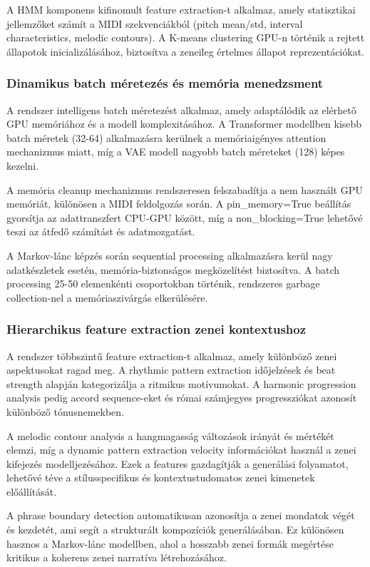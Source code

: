 A HMM komponens kifinomult feature extraction-t alkalmaz, amely statisztikai jellemzőket számít a MIDI szekvenciákból (pitch mean/std, interval characteristics, melodic contours). A K-means clustering GPU-n történik a rejtett állapotok inicializálásához, biztosítva a zeneileg értelmes állapot reprezentációkat.

\subsubsection{Dinamikus batch méretezés és memória menedzsment}
A rendszer intelligens batch méretezést alkalmaz, amely adaptálódik az elérhető GPU memóriához és a modell komplexitásához. A Transformer modellben kisebb batch méretek (32-64) alkalmazásra kerülnek a memóriaigényes attention mechanizmus miatt, míg a VAE modell nagyobb batch méreteket (128) képes kezelni.

A memória cleanup mechanizmus rendszeresen felszabadítja a nem használt GPU memóriát, különösen a MIDI feldolgozás során. A pin_memory=True beállítás gyorsítja az adattranszfert CPU-GPU között, míg a non_blocking=True lehetővé teszi az átfedő számítást és adatmozgatást.

A Markov-lánc képzés során sequential processing alkalmazásra kerül nagy adatkészletek esetén, memória-biztonságos megközelítést biztosítva. A batch processing 25-50 elemenkénti csoportokban történik, rendszeres garbage collection-nel a memóriaszivárgás elkerülésére.

\subsubsection{Hierarchikus feature extraction zenei kontextushoz}
A rendszer többszintű feature extraction-t alkalmaz, amely különböző zenei aspektusokat ragad meg. A rhythmic pattern extraction időjelzések és beat strength alapján kategorizálja a ritmikus motívumokat. A harmonic progression analysis pedig accord sequence-eket és római számjegyes progressziókat azonosít különböző tónusnemekben.

A melodic contour analysis a hangmagasság változások irányát és mértékét elemzi, míg a dynamic pattern extraction velocity információkat használ a zenei kifejezés modelljezésához. Ezek a features gazdagítják a generálási folyamatot, lehetővé téve a stílusspecifikus és kontextustudomatos zenei kimenetek előállítását.

A phrase boundary detection automatikusan azonosítja a zenei mondatok végét és kezdetét, ami segít a strukturált kompozíciók generálásában. Ez különösen hasznos a Markov-lánc modellben, ahol a hosszabb zenei formák megértése kritikus a koherens zenei narratíva létrehozásához.

